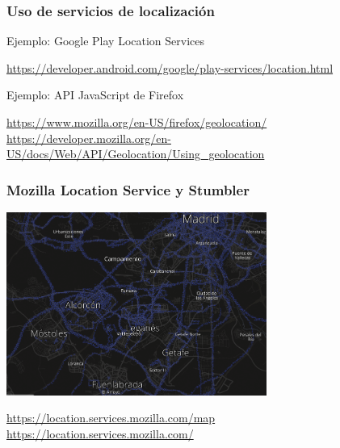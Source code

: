 \begin{frame}
\frametitle{Uso de servicios de localización}

{\Large
Ejemplo: Google Play Location Services \\
}
\begin{flushright}
\url{https://developer.android.com/google/play-services/location.html}
\end{flushright}

{\Large
Ejemplo: API JavaScript de Firefox \\
}

\begin{flushright}
\url{https://www.mozilla.org/en-US/firefox/geolocation/} \\
\url{https://developer.mozilla.org/en-US/docs/Web/API/Geolocation/Using_geolocation}
\end{flushright}
\end{frame}

\begin{frame}
\frametitle{Mozilla Location Service y Stumbler}

\includegraphics[height=6cm]{figs/mozilla-location-map}

\begin{flushright}
  \url{https://location.services.mozilla.com/map} \\
  \url{https://location.services.mozilla.com/} \\
\end{flushright}
\end{frame}

